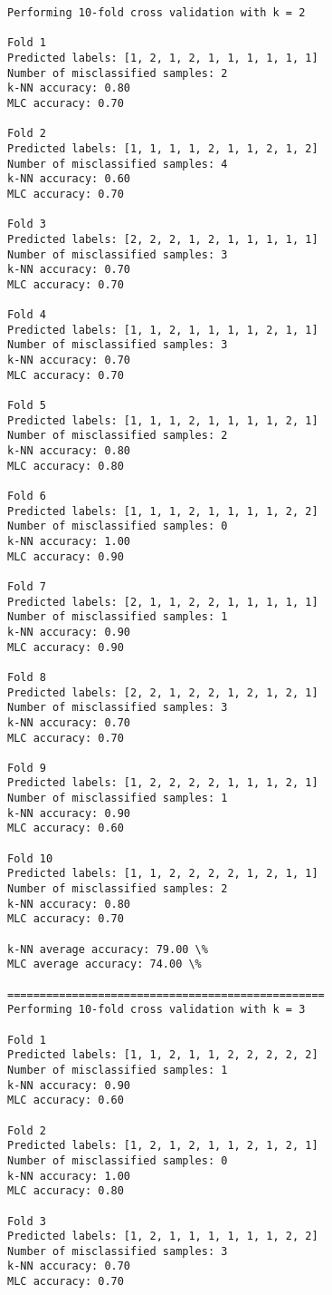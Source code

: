\documentclass[11pt]{article}
\begin{document}
    \begin{Verbatim}[commandchars=\\\{\}]
Performing 10-fold cross validation with k = 2

Fold 1
Predicted labels: [1, 2, 1, 2, 1, 1, 1, 1, 1, 1]
Number of misclassified samples: 2
k-NN accuracy: 0.80
MLC accuracy: 0.70

Fold 2
Predicted labels: [1, 1, 1, 1, 2, 1, 1, 2, 1, 2]
Number of misclassified samples: 4
k-NN accuracy: 0.60
MLC accuracy: 0.70

Fold 3
Predicted labels: [2, 2, 2, 1, 2, 1, 1, 1, 1, 1]
Number of misclassified samples: 3
k-NN accuracy: 0.70
MLC accuracy: 0.70

Fold 4
Predicted labels: [1, 1, 2, 1, 1, 1, 1, 2, 1, 1]
Number of misclassified samples: 3
k-NN accuracy: 0.70
MLC accuracy: 0.70

Fold 5
Predicted labels: [1, 1, 1, 2, 1, 1, 1, 1, 2, 1]
Number of misclassified samples: 2
k-NN accuracy: 0.80
MLC accuracy: 0.80

Fold 6
Predicted labels: [1, 1, 1, 2, 1, 1, 1, 1, 2, 2]
Number of misclassified samples: 0
k-NN accuracy: 1.00
MLC accuracy: 0.90

Fold 7
Predicted labels: [2, 1, 1, 2, 2, 1, 1, 1, 1, 1]
Number of misclassified samples: 1
k-NN accuracy: 0.90
MLC accuracy: 0.90

Fold 8
Predicted labels: [2, 2, 1, 2, 2, 1, 2, 1, 2, 1]
Number of misclassified samples: 3
k-NN accuracy: 0.70
MLC accuracy: 0.70

Fold 9
Predicted labels: [1, 2, 2, 2, 2, 1, 1, 1, 2, 1]
Number of misclassified samples: 1
k-NN accuracy: 0.90
MLC accuracy: 0.60

Fold 10
Predicted labels: [1, 1, 2, 2, 2, 2, 1, 2, 1, 1]
Number of misclassified samples: 2
k-NN accuracy: 0.80
MLC accuracy: 0.70

k-NN average accuracy: 79.00 \%
MLC average accuracy: 74.00 \%

=================================================
Performing 10-fold cross validation with k = 3

Fold 1
Predicted labels: [1, 1, 2, 1, 1, 2, 2, 2, 2, 2]
Number of misclassified samples: 1
k-NN accuracy: 0.90
MLC accuracy: 0.60

Fold 2
Predicted labels: [1, 2, 1, 2, 1, 1, 2, 1, 2, 1]
Number of misclassified samples: 0
k-NN accuracy: 1.00
MLC accuracy: 0.80

Fold 3
Predicted labels: [1, 2, 1, 1, 1, 1, 1, 1, 2, 2]
Number of misclassified samples: 3
k-NN accuracy: 0.70
MLC accuracy: 0.70


\end{Verbatim}
\end{document}

